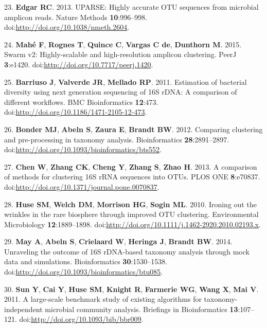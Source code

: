 \documentclass[11pt,]{article}
\begin{document}
23. \textbf{Edgar RC}. 2013. UPARSE: Highly accurate OTU sequences from
microbial amplicon reads. Nature Methods \textbf{10}:996--998.
doi:\url{http://doi.org/10.1038/nmeth.2604}.

24. \textbf{Mahé F}, \textbf{Rognes T}, \textbf{Quince C},
\textbf{Vargas C de}, \textbf{Dunthorn M}. 2015. Swarm v2:
Highly-scalable and high-resolution amplicon clustering. PeerJ
\textbf{3}:e1420. doi:\url{http://doi.org/10.7717/peerj.1420}.

25. \textbf{Barriuso J}, \textbf{Valverde JR}, \textbf{Mellado RP}.
2011. Estimation of bacterial diversity using next generation sequencing
of 16S rDNA: A comparison of different workflows. BMC Bioinformatics
\textbf{12}:473. doi:\url{http://doi.org/10.1186/1471-2105-12-473}.

26. \textbf{Bonder MJ}, \textbf{Abeln S}, \textbf{Zaura E},
\textbf{Brandt BW}. 2012. Comparing clustering and pre-processing in
taxonomy analysis. Bioinformatics \textbf{28}:2891--2897.
doi:\url{http://doi.org/10.1093/bioinformatics/bts552}.

27. \textbf{Chen W}, \textbf{Zhang CK}, \textbf{Cheng Y}, \textbf{Zhang
S}, \textbf{Zhao H}. 2013. A comparison of methods for clustering 16S
rRNA sequences into OTUs. PLOS ONE \textbf{8}:e70837.
doi:\url{http://doi.org/10.1371/journal.pone.0070837}.

28. \textbf{Huse SM}, \textbf{Welch DM}, \textbf{Morrison HG},
\textbf{Sogin ML}. 2010. Ironing out the wrinkles in the rare biosphere
through improved OTU clustering. Environmental Microbiology
\textbf{12}:1889--1898.
doi:\url{http://doi.org/10.1111/j.1462-2920.2010.02193.x}.

29. \textbf{May A}, \textbf{Abeln S}, \textbf{Crielaard W},
\textbf{Heringa J}, \textbf{Brandt BW}. 2014. Unraveling the outcome of
16S rDNA-based taxonomy analysis through mock data and simulations.
Bioinformatics \textbf{30}:1530--1538.
doi:\url{http://doi.org/10.1093/bioinformatics/btu085}.

30. \textbf{Sun Y}, \textbf{Cai Y}, \textbf{Huse SM}, \textbf{Knight R},
\textbf{Farmerie WG}, \textbf{Wang X}, \textbf{Mai V}. 2011. A
large-scale benchmark study of existing algorithms for
taxonomy-independent microbial community analysis. Briefings in
Bioinformatics \textbf{13}:107--121.
doi:\url{http://doi.org/10.1093/bib/bbr009}.
\end{document}
